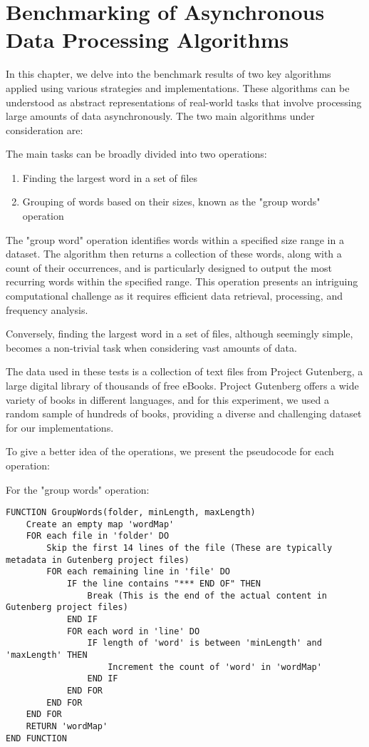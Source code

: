 

\chapter{Benchmarking of Asynchronous Data Processing Algorithms}
\label{cha:a_short_latex_tutorial_with_examples}

In this chapter, we delve into the benchmark results of two key algorithms applied using various strategies and implementations. These algorithms can be understood as abstract representations of real-world tasks that involve processing large amounts of data asynchronously. The two main algorithms under consideration are:

The main tasks can be broadly divided into two operations:

\begin{enumerate}
\item Finding the largest word in a set of files
\item Grouping of words based on their sizes, known as the "group words" operation
\end{enumerate}

The "group word" operation identifies words within a specified size range in a dataset. The algorithm then returns a collection of these words, along with a count of their occurrences, and is particularly designed to output the most recurring words within the specified range. This operation presents an intriguing computational challenge as it requires efficient data retrieval, processing, and frequency analysis.

Conversely, finding the largest word in a set of files, although seemingly simple, becomes a non-trivial task when considering vast amounts of data.

The data used in these tests is a collection of text files from Project Gutenberg, a large digital library of thousands of free eBooks. Project Gutenberg offers a wide variety of books in different languages, and for this experiment, we used a random sample of hundreds of books, providing a diverse and challenging dataset for our implementations.

To give a better idea of the operations, we present the pseudocode for each operation:


For the "group words" operation:

\begin{verbatim}
FUNCTION GroupWords(folder, minLength, maxLength)
    Create an empty map 'wordMap'
    FOR each file in 'folder' DO
        Skip the first 14 lines of the file (These are typically metadata in Gutenberg project files)
        FOR each remaining line in 'file' DO
            IF the line contains "*** END OF" THEN
                Break (This is the end of the actual content in Gutenberg project files)
            END IF
            FOR each word in 'line' DO
                IF length of 'word' is between 'minLength' and 'maxLength' THEN
                    Increment the count of 'word' in 'wordMap'
                END IF
            END FOR
        END FOR
    END FOR
    RETURN 'wordMap'
END FUNCTION

\end{verbatim}

